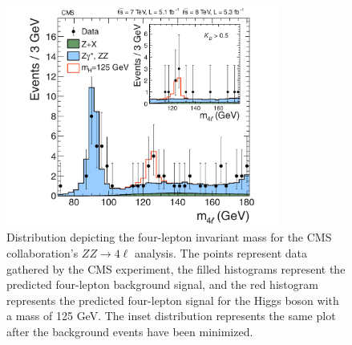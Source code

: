\documentclass[12pt]{article}
\begin{document}
\begin{figure}[h!]
\centering
\includegraphics[width=0.8\textwidth]{images/HtoZZ}
\caption{Distribution depicting the four-lepton invariant mass for the CMS collaboration's $ZZ \to 4 \ell$ analysis. The points represent data gathered by the CMS experiment, the filled histograms represent the predicted four-lepton background signal, and the red histogram represents the predicted four-lepton signal for the Higgs boson with a mass of 125 GeV. The inset distribution represents the same plot after the background events have been minimized.}
\label{HtoZZ}
\end{figure}
\end{document}
